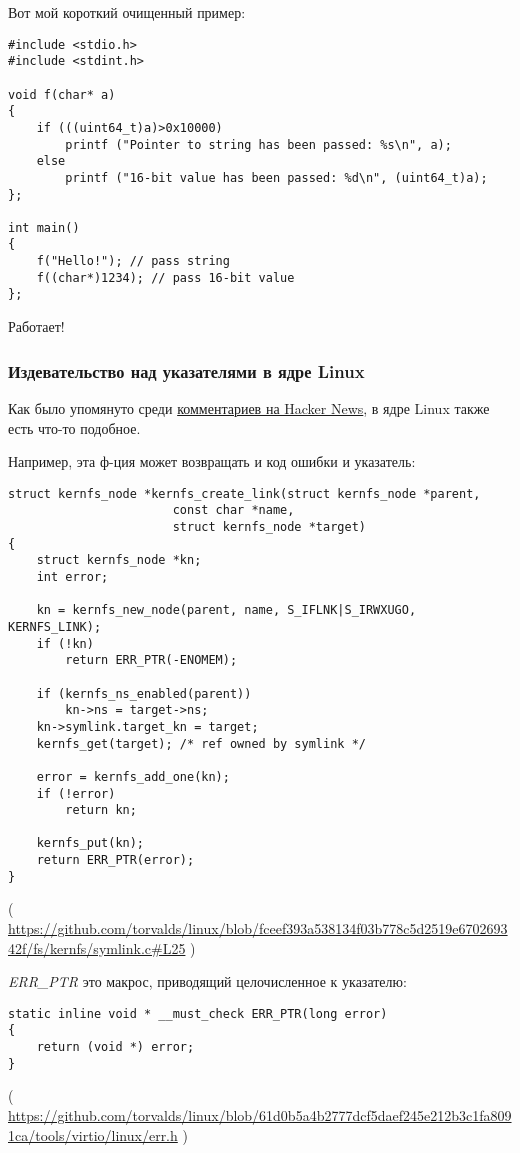 Вот мой короткий очищенный пример:

\begin{lstlisting}[style=customc]
#include <stdio.h>
#include <stdint.h>

void f(char* a)
{
	if (((uint64_t)a)>0x10000)
		printf ("Pointer to string has been passed: %s\n", a);
	else
		printf ("16-bit value has been passed: %d\n", (uint64_t)a);
};

int main()
{
	f("Hello!"); // pass string
	f((char*)1234); // pass 16-bit value
};
\end{lstlisting}

Работает!

\subsubsection{Издевательство над указателями в ядре Linux}

Как было упомянуто среди \href{https://news.ycombinator.com/item?id=11823647}{комментариев на Hacker News},
в ядре Linux также есть что-то подобное.

Например, эта ф-ция может возвращать и код ошибки и указатель:

\begin{lstlisting}[style=customc]
struct kernfs_node *kernfs_create_link(struct kernfs_node *parent,
				       const char *name,
				       struct kernfs_node *target)
{
	struct kernfs_node *kn;
	int error;

	kn = kernfs_new_node(parent, name, S_IFLNK|S_IRWXUGO, KERNFS_LINK);
	if (!kn)
		return ERR_PTR(-ENOMEM);

	if (kernfs_ns_enabled(parent))
		kn->ns = target->ns;
	kn->symlink.target_kn = target;
	kernfs_get(target);	/* ref owned by symlink */

	error = kernfs_add_one(kn);
	if (!error)
		return kn;

	kernfs_put(kn);
	return ERR_PTR(error);
}
\end{lstlisting}

( \url{https://github.com/torvalds/linux/blob/fceef393a538134f03b778c5d2519e670269342f/fs/kernfs/symlink.c#L25} )

\emph{ERR\_PTR} это макрос, приводящий целочисленное к указателю:

\begin{lstlisting}[style=customc]
static inline void * __must_check ERR_PTR(long error)
{
	return (void *) error;
}
\end{lstlisting}

( \url{https://github.com/torvalds/linux/blob/61d0b5a4b2777dcf5daef245e212b3c1fa8091ca/tools/virtio/linux/err.h} )

